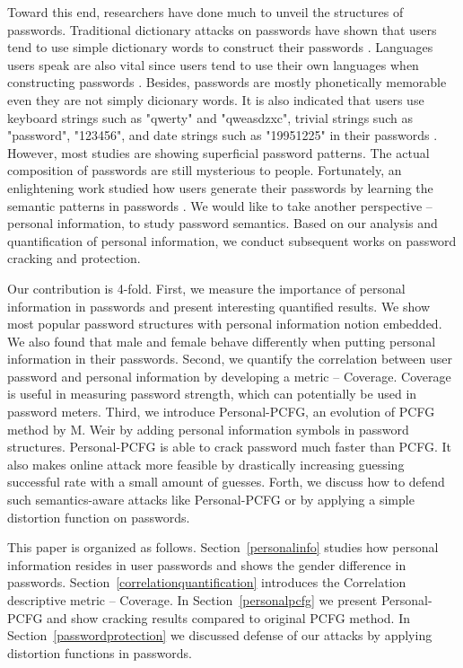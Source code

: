 Toward this end, researchers have done much to unveil the structures of passwords. Traditional dictionary attacks on passwords have shown that users tend to use simple dictionary words to construct their passwords \cite{hellman1980cryptanalytic}\cite{morris1979password}. Languages users speak are also vital since users tend to use their own languages when constructing passwords \cite{bonneau2012science}. Besides, passwords are mostly phonetically memorable \cite{narayanan2005fast} even they are not simply dicionary words. It is also indicated that users use keyboard strings such as "qwerty" and "qweasdzxc", trivial strings such as "password", "123456", and date strings such as "19951225" in their passwords \cite{li2014large}\cite{schweitzer2009visualizing}\cite{veras2012visualizing}. However, most studies are showing superficial password patterns. The actual composition of passwords are still mysterious to people. Fortunately, an enlightening work studied how users generate their passwords by learning the semantic patterns in passwords \cite{veras2014semantic}. We would like to take another perspective -- personal information, to study password semantics. Based on our analysis and quantification of personal information, we conduct subsequent works on password cracking and protection. 

Our contribution is 4-fold. First, we measure the importance of personal information in passwords and present interesting quantified results. We show most popular password structures with personal information notion embedded. We also found that male and female behave differently when putting personal information in their passwords. Second, we quantify the correlation between user password and personal information by developing a metric -- Coverage. Coverage is useful in measuring password strength, which can potentially be used in password meters. Third, we introduce Personal-PCFG, an evolution of PCFG method by M. Weir\cite{weir2009password} by adding personal information symbols in password structures. Personal-PCFG is able to crack password much faster than PCFG. It also makes online attack more feasible by drastically increasing guessing successful rate with a small amount of guesses. Forth, we discuss how to defend such semantics-aware attacks like Personal-PCFG or \cite{veras2014semantic} by applying a simple distortion function on passwords. 

This paper is organized as follows. Section~\ref{personalinfo} studies how personal information resides in user passwords and shows the gender difference in passwords. Section~\ref{correlationquantification} introduces the Correlation descriptive metric -- Coverage. In Section~\ref{personalpcfg} we present Personal-PCFG and show cracking results compared to original PCFG method. In Section~\ref{passwordprotection} we discussed defense of our attacks by applying distortion functions in passwords.
